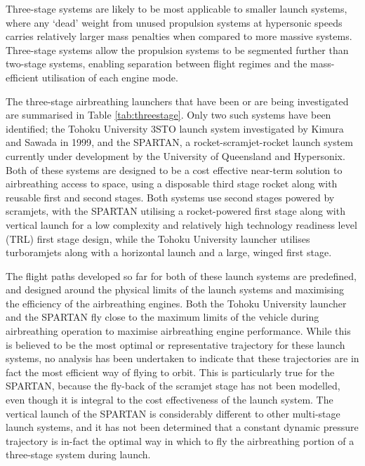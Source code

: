 Three-stage systems are likely to be most applicable to smaller launch systems, where any `dead' weight from unused propulsion systems at hypersonic speeds carries relatively larger mass penalties when compared to more massive systems. Three-stage systems allow the propulsion systems to be segmented further than two-stage systems, enabling separation between flight regimes and the mass-efficient utilisation of each engine mode\cite{Preller2017b}.

The three-stage airbreathing launchers that have been or are being investigated are summarised in Table \ref{tab:threestage}. Only two such systems have been identified; the Tohoku University 3STO launch system investigated by Kimura and Sawada in 1999\cite{Kimura1999}, and the SPARTAN, a rocket-scramjet-rocket launch system currently under development by the University of Queensland and Hypersonix\cite{Preller2017b,Hypersonix}. Both of these systems are designed to be a cost effective near-term solution to airbreathing access to space, using a disposable third stage rocket along with reusable first and second stages. Both systems use second stages powered by scramjets, with the SPARTAN utilising a rocket-powered first stage along with vertical launch for a low complexity and relatively high technology readiness level (TRL) first stage design, while the Tohoku University launcher utilises turboramjets along with a horizontal launch and a large, winged first stage\cite{Kimura1999}. 

 The flight paths developed so far for both of these launch systems are predefined, and designed around the physical limits of the launch systems and maximising the efficiency of the airbreathing engines. Both the Tohoku University launcher and the SPARTAN fly close to the maximum limits of the vehicle during airbreathing operation to maximise airbreathing engine performance\cite{Preller2017b,Kimura1999}.
While this is believed to be the most optimal or representative trajectory for these launch systems, no analysis has been undertaken to indicate that these trajectories are in fact the most efficient way of flying to orbit. This is particularly true for the SPARTAN, because the fly-back of the scramjet stage has not been modelled, even though it is integral to the cost effectiveness of the launch system\cite{Preller2017b}. 
The vertical launch of the SPARTAN is considerably different to other multi-stage launch systems, and it has not been determined that a constant dynamic pressure trajectory is in-fact the optimal way in which to fly the airbreathing portion of a three-stage system during launch. 


